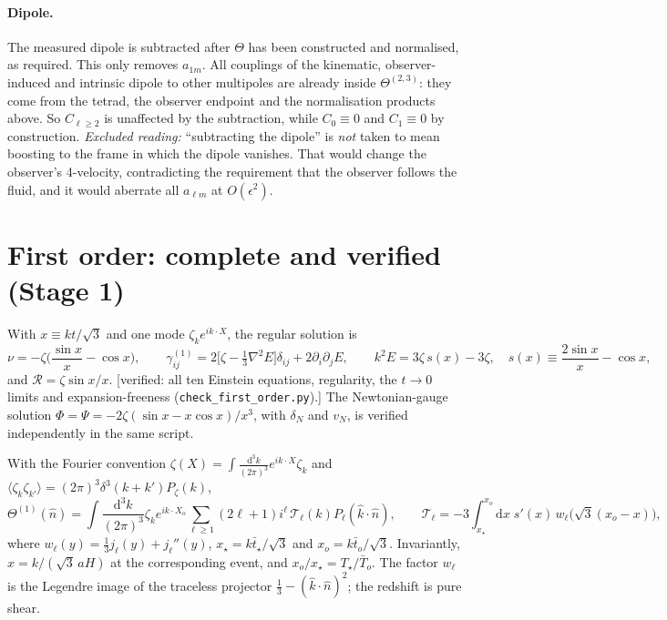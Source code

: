 \documentclass[11pt]{article}
\theoremstyle{definition}
\theoremstyle{remark}
\newcommand{\eps}{\epsilon}
\newcommand{\nhat}{\hat n}
\newcommand{\dd}{\mathrm{d}}
\newcommand{\ens}[1]{\langle #1\rangle}
\newcommand{\status}[1]{\textsf{[#1]}}
\begin{document}
\paragraph{Dipole.}\label{sec:dipole} The measured dipole is subtracted
after $\Theta$ has been constructed and normalised, as required. This only
removes $a_{1m}$. All couplings of the kinematic, observer-induced and
intrinsic dipole to other multipoles are already inside $\Theta^{(2,3)}$:
they come from the tetrad, the observer endpoint and the normalisation
products above. So $C_{\ell\ge2}$ is unaffected by the subtraction, while
$C_0\equiv0$ and $C_1\equiv0$ by construction. \emph{Excluded reading:}
``subtracting the dipole'' is \emph{not} taken to mean boosting to the frame
in which the dipole vanishes. That would change the observer's 4-velocity,
contradicting the requirement that the observer follows the fluid, and it
would aberrate all $a_{\ell m}$ at $O(\eps^2)$.

\section{First order: complete and verified (Stage 1)}\label{sec:first}

With $x\equiv kt/\sqrt3$ and one mode $\zeta_k e^{ik\cdot X}$, the regular
solution is
\[
\nu=-\zeta\Big(\frac{\sin x}x-\cos x\Big),\qquad
\gamma^{(1)}_{ij}=2\Big[\zeta-\tfrac{1}{3}\nabla^2E\Big]\delta_{ij}+2\partial_i\partial_jE,\qquad
k^2E=3\zeta\,s(x)-3\zeta,\quad s(x)\equiv\frac{2\sin x}x-\cos x,
\]
and $\mathcal R=\zeta\sin x/x$.
\status{verified: all ten Einstein equations, regularity, the $t\to0$ limits
and expansion-freeness (\texttt{check\_first\_order.py}).} The
Newtonian-gauge solution $\Phi=\Psi=-2\zeta(\sin x-x\cos x)/x^3$, with
$\delta_N$ and $v_N$, is verified independently in the same script.

With the Fourier convention
$\zeta(X)=\int\!\frac{\dd^3k}{(2\pi)^3}e^{ik\cdot X}\zeta_k$ and
$\ens{\zeta_k\zeta_{k'}}=(2\pi)^3\delta^3(k+k')P_\zeta(k)$,
\[
\Theta^{(1)}(\nhat)=\int\!\frac{\dd^3k}{(2\pi)^3}\zeta_ke^{ik\cdot X_o}\sum_{\ell\ge1}(2\ell+1)i^\ell\,\mathcal T_\ell(k)P_\ell(\hat k\cdot\nhat),\qquad
\mathcal T_\ell=-3\!\int_{x_\star}^{x_o}\!\dd x\;s'(x)\,w_\ell\big(\sqrt3(x_o-x)\big),
\]
where $w_\ell(y)=\tfrac13j_\ell(y)+j_\ell''(y)$, $x_\star=k\bar t_\star/\sqrt3$
and $x_o=k\bar t_o/\sqrt3$. Invariantly,
$x=k/(\sqrt3\,aH)$ at the corresponding event, and $x_o/x_\star=T_\star/\bar
T_o$. The factor $w_\ell$ is the Legendre image of the traceless projector
$\tfrac13-(\hat k\cdot\nhat)^2$; the redshift is pure shear.
\end{document}
